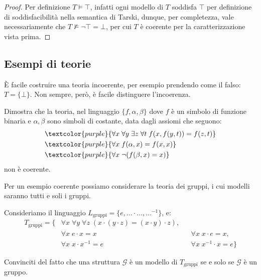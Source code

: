 \begin{proof}
    Per definizione $T \models \top$, infatti ogni modello di $T$ soddisfa $\top$ per definizione di soddisfacibilità nella semantica di Tarski, dunque, per completezza, vale necessariamente che $T \not\models \neg \top = \bot$,
    per cui $T$ è coerente per la caratterizzazione vista prima.
\end{proof}

\subsection{Esempi di teorie}
È facile costruire una teoria incoerente, per esempio prendendo come  il falso: $T = \{\bot\}$. Non sempre, però, è facile distinguere l'incoerenza.

\begin{exercise}
    Dimostra che la teoria, nel linguaggio $\{f,\alpha, \beta\}$ dove $f$ è un simbolo di funzione binaria e $\alpha,\beta$ sono simboli di costante, data dagli assiomi che seguono:
    \begin{align*}
        & \textcolor{purple}{\forall x \; \forall y \; \exists z \; \forall t \; f(x,f(y,t)) = f(z,t)} \\
        & \textcolor{purple}{\forall x \; f(\alpha,x) = f(x,x)} \\
        & \textcolor{purple}{\forall x \; \neg (f(\beta,x) = x)}
    \end{align*}
    non è coerente.
\end{exercise}

Per un esempio coerente possiamo considerare la teoria dei gruppi, i cui modelli saranno tutti e soli i gruppi.

\begin{example}
    Consideriamo il linguaggio $L_{\text{gruppi}} = \{e,\ldots \cdot \ldots, {\ldots}^{-1}\}$, e:
    \begin{align*}
        T_{\text{gruppi}} = \{& \forall x \; \forall y \; \forall z \; (x \cdot (y \cdot z) = (x \cdot y) \cdot z), \\
        & \forall x \; e \cdot x = x && \forall x \; x \cdot e = x, \\
        & \forall x \; x \cdot x^{-1} = e && \forall x \; x^{-1} \cdot x = e \}
    \end{align*}
\end{example}

\begin{exercise}
    Convinciti del fatto che una struttura $\mathcal G$ è un modello di $T_{\text{gruppi}}$ se e solo se $\mathcal G$ è un gruppo.
\end{exercise}

